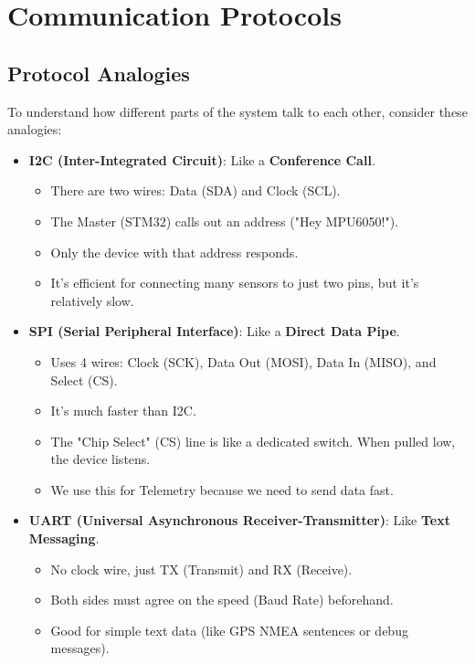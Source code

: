 \documentclass[11pt,a4paper]{article}
\begin{document}
\section{Communication Protocols}

\subsection{Protocol Analogies}
To understand how different parts of the system talk to each other, consider these analogies:

\begin{itemize}
    \item \textbf{I2C (Inter-Integrated Circuit)}: Like a \textbf{Conference Call}.
    \begin{itemize}
        \item There are two wires: Data (SDA) and Clock (SCL).
        \item The Master (STM32) calls out an address ("Hey MPU6050!").
        \item Only the device with that address responds.
        \item It's efficient for connecting many sensors to just two pins, but it's relatively slow.
    \end{itemize}
    
    \item \textbf{SPI (Serial Peripheral Interface)}: Like a \textbf{Direct Data Pipe}.
    \begin{itemize}
        \item Uses 4 wires: Clock (SCK), Data Out (MOSI), Data In (MISO), and Select (CS).
        \item It's much faster than I2C.
        \item The "Chip Select" (CS) line is like a dedicated switch. When pulled low, the device listens.
        \item We use this for Telemetry because we need to send data fast.
    \end{itemize}
    
    \item \textbf{UART (Universal Asynchronous Receiver-Transmitter)}: Like \textbf{Text Messaging}.
    \begin{itemize}
        \item No clock wire, just TX (Transmit) and RX (Receive).
        \item Both sides must agree on the speed (Baud Rate) beforehand.
        \item Good for simple text data (like GPS NMEA sentences or debug messages).
    \end{itemize}
\end{itemize}
\end{document}
